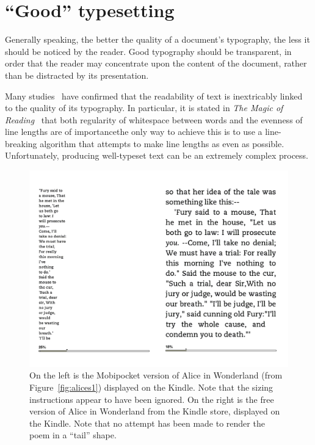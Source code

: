 \section{``Good'' typesetting}
\label{sec:goodtypesetting}

Generally speaking, the better the quality of a document's typography, the less it should be noticed by the reader. Good typography should be transparent, in order that the reader may concentrate upon the content of the document, rather than be distracted by its presentation.

Many studies~\cite{Mittelbach1992,Hill1999,Bringhurst2008,Voorhees2011,Legge2011} have confirmed that the readability of text is inextricably linked to the quality of its typography. In particular, it is stated in \emph{The Magic of Reading}~\cite{Hill1999} that both regularity of whitespace between words and the evenness of line lengths are of importance\ed the only way to achieve this is to use a line-breaking algorithm that attempts to make line lengths as even as possible. Unfortunately, producing well-typeset text can be an extremely complex process.

\begin{figure}
\includegraphics[width=\textwidth]{gfx/alices2}
\vspace{-0.2in}
\caption[Same document displayed on the Kindle]{On the left is the Mobipocket version of Alice in Wonderland (from Figure~\ref{fig:alices1}) displayed on the Kindle. Note that the sizing instructions appear to have been ignored. On the right is the free version of Alice in Wonderland from the Kindle store, displayed on the Kindle. Note that no attempt has been made to render the poem in a ``tail'' shape.}
\label{fig:alices2}
\end{figure}

